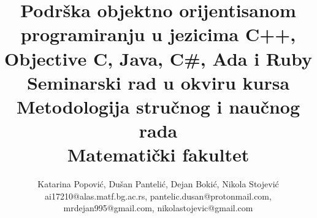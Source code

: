 \documentclass[a4paper]{article}
\begin{document}
\title{\Large Podrška objektno orijentisanom programiranju u jezicima C++, Objective C, Java, C\#, Ada i Ruby\\ \small{Seminarski rad u okviru kursa\\Metodologija stručnog i naučnog rada\\ Matematički fakultet}}

\author{Katarina Popović, Dušan Pantelić, Dejan Bokić, Nikola Stojević\\ ai17210@alas.matf.bg.ac.rs, pantelic.dusan@protonmail.com,\\ mrdejan995@gmail.com, nikolastojevic@gmail.com}


\maketitle
\end{document}
